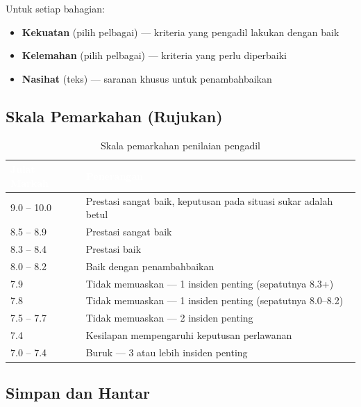 \documentclass[12pt,a4paper]{report}
\begin{document}
Untuk setiap bahagian:
\begin{itemize}[label=\textcolor{pbnpblue}{\faChevronRight}, nosep]
  \item \textcolor{successgreen}{\textbf{Kekuatan}} (pilih pelbagai) --- kriteria yang pengadil lakukan dengan baik
  \item \textcolor{dangered}{\textbf{Kelemahan}} (pilih pelbagai) --- kriteria yang perlu diperbaiki
  \item \textbf{Nasihat} (teks) --- saranan khusus untuk penambahbaikan
\end{itemize}

\subsection{Skala Pemarkahan (Rujukan)}

\begin{table}[H]
\centering
\begin{tabularx}{\textwidth}{l X}
\toprule
\rowcolor{tableheader}
\textcolor{white}{\textbf{Julat Markah}} & \textcolor{white}{\textbf{Penerangan}} \\
\midrule
\rowcolor{successgreen!10} 9.0 -- 10.0 & Prestasi sangat baik, keputusan pada situasi sukar adalah betul \\
\rowcolor{successgreen!8} 8.5 -- 8.9 & Prestasi sangat baik \\
\rowcolor{successgreen!5} 8.3 -- 8.4 & Prestasi baik \\
\rowcolor{primaryblue!8} 8.0 -- 8.2 & Baik dengan penambahbaikan \\
\rowcolor{warningyellow!8} 7.9 & Tidak memuaskan --- 1 insiden penting (sepatutnya 8.3+) \\
\rowcolor{warningyellow!10} 7.8 & Tidak memuaskan --- 1 insiden penting (sepatutnya 8.0--8.2) \\
\rowcolor{warningyellow!12} 7.5 -- 7.7 & Tidak memuaskan --- 2 insiden penting \\
\rowcolor{dangered!8} 7.4 & Kesilapan mempengaruhi keputusan perlawanan \\
\rowcolor{dangered!12} 7.0 -- 7.4 & Buruk --- 3 atau lebih insiden penting \\
\bottomrule
\end{tabularx}
\caption{Skala pemarkahan penilaian pengadil}
\end{table}

\subsection{Simpan dan Hantar}
\end{document}
